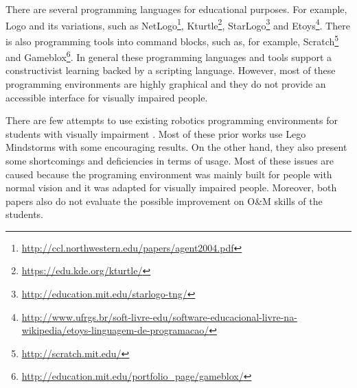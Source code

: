 There are several programming languages for educational purposes. For example, Logo and its variations, such as 
NetLogo\footnote{\url{http://ccl.northwestern.edu/papers/agent2004.pdf}}, Kturtle\footnote{\url{https://edu.kde.org/kturtle/}}, StarLogo\footnote{\url{http://education.mit.edu/starlogo-tng/}} and
Etoys\footnote{\url{http://www.ufrgs.br/soft-livre-edu/software-educacional-livre-na-wikipedia/etoys-linguagem-de-programacao/}}. There is also programming tools into command blocks, such as, for example, 
Scratch\footnote{\url{http://scratch.mit.edu/}} and Gameblox\footnote{\url{http://education.mit.edu/portfolio_page/gameblox/}}. 
In general these programming languages and tools support a constructivist learning backed by a scripting language. However, most of these programming environments are highly graphical and they do not provide an accessible interface for visually impaired people.

There are few attempts to use existing robotics programming environments for students with visually impairment \cite{ludi2011, howard2012}. Most of these prior works use Lego Mindstorms with some encouraging results. On the other hand, they also present some shortcomings and deficiencies in terms of usage. Most of these issues are caused because the programing environment was mainly built for people with normal vision and it was adapted for visually impaired people. Moreover, both papers \cite{ludi2011, howard2012} also do not evaluate the possible improvement on O\&M skills of the students. 

